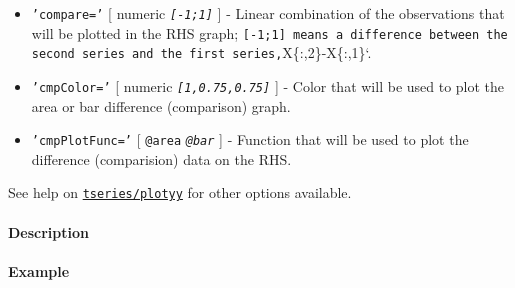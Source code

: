 \begin{itemize}
\item
  \texttt{'compare='} {[} numeric \textbar{} \emph{\texttt{{[}-1;1{]}}}
  {]} - Linear combination of the observations that will be plotted in
  the RHS graph;
  \texttt{{[}-1;1{]} means a difference between the second series and the first series,}X\{:,2\}-X\{:,1\}`.
\item
  \texttt{'cmpColor='} {[} numeric \textbar{}
  \emph{\texttt{{[}1,0.75,0.75{]}}} {]} - Color that will be used to
  plot the area or bar difference (comparison) graph.
\item
  \texttt{'cmpPlotFunc='} {[} \texttt{@area} \textbar{}
  \emph{\texttt{@bar}} {]} - Function that will be used to plot the
  difference (comparision) data on the RHS.
\end{itemize}

See help on \href{tseries/plotyy}{\texttt{tseries/plotyy}} for other
options available.

\paragraph{Description}\label{description}

\paragraph{Example}\label{example}


